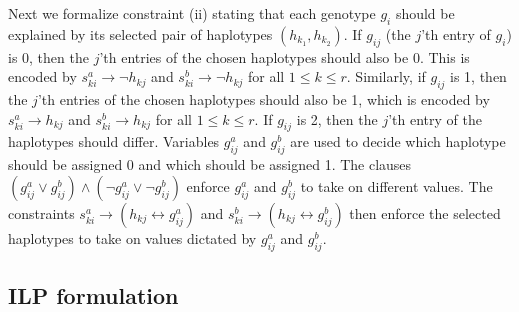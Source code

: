 \documentclass[12pt,a4paper]{article}
\begin{document}
Next we formalize constraint (ii) stating that each genotype $g_i$ should be explained by its selected pair of haplotypes $(h_{k_1}, h_{k_2})$.
If $g_{ij}$ (the $j$'th entry of $g_i$) is 0, then the $j$'th entries of the chosen haplotypes should also be 0.
This is encoded by $s^a_{ki}\rightarrow\neg h_{kj}$ and $s^b_{ki}\rightarrow\neg h_{kj}$ for all $1\leq k \leq r$.
Similarly, if $g_{ij}$ is 1, then the $j$'th entries of the chosen haplotypes should also be 1, which is encoded by $s^a_{ki}\rightarrow h_{kj}$ and $s^b_{ki}\rightarrow h_{kj}$ for all $1\leq k \leq r$.
If $g_{ij}$ is 2, then the $j$'th entry of the haplotypes should differ.
Variables $g^a_{ij}$ and $g^b_{ij}$ are used to decide which haplotype should be assigned 0 and which should be assigned 1.
The clauses $(g^a_{ij}\vee g^b_{ij})\wedge(\neg g^a_{ij}\vee \neg g^b_{ij})$ enforce $g^a_{ij}$ and $g^b_{ij}$ to take on different values.
The constraints $s^a_{ki}\rightarrow (h_{kj}\leftrightarrow g^a_{ij})$ and $s^b_{ki}\rightarrow (h_{kj}\leftrightarrow g^b_{ij})$ then enforce the selected haplotypes to take on values dictated by $g^a_{ij}$ and $g^b_{ij}$.
\subsection{ILP formulation}



\end{document}

